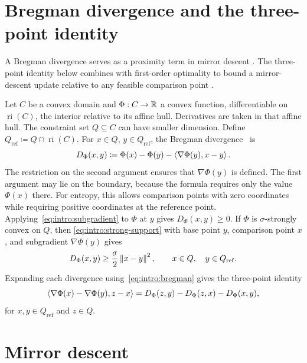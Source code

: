 \section{Bregman divergence and the three-point identity}
\label{sec:intro:bregman}

A Bregman divergence serves as a proximity term in mirror
descent \cite{shalev2007primal,abernethy2009competing,hazan2010extracting}.
The three-point identity below combines with first-order optimality to bound
a mirror-descent update relative to any feasible comparison point
\cite{prox-siam93,SGD-robust,tseng-accelerated,wei2020online}.

Let $C$ be a convex domain and $\Phi:C\to\mathbb{R}$ a convex function,
differentiable on $\operatorname{ri}(C)$, the interior relative
to its affine hull. Derivatives are taken in that affine hull. The
constraint set $Q\subseteq C$ can have smaller dimension. Define
$Q_{\mathrm{ref}}\coloneqq Q\cap \operatorname{ri}(C)$. For $x\in Q$, $y\in Q_{\mathrm{ref}}$, the Bregman
divergence~\cite{bregman1967relaxation} is
\begin{equation}\label{eq:intro:bregman}
 D_\Phi(x,y)\coloneqq\Phi(x)-\Phi(y)-\left\langle \nabla\Phi(y),x-y \right\rangle.
\end{equation}
The restriction on the second argument ensures that $\nabla\Phi(y)$ is
defined. The first argument may lie on the boundary, because the formula
requires only the value $\Phi(x)$ there. For entropy, this allows comparison
points with zero coordinates while requiring positive coordinates at the
reference point.
Applying~\eqref{eq:intro:subgradient} to $\Phi$ at $y$ gives
$D_\Phi(x,y)\ge0$. If $\Phi$ is $\sigma$-strongly convex on $Q$, then
\eqref{eq:intro:strong-support} with base point $y$, comparison point $x$,
and subgradient $\nabla\Phi(y)$ gives
\begin{equation}\label{eq:intro:bregman-curvature}
 D_\Phi(x,y)\ge\frac\sigma2\left\lVert x-y \right\rVert^2,
 \qquad x\in Q,\quad y\in Q_{\mathrm{ref}}.
\end{equation}
Expanding each divergence using~\eqref{eq:intro:bregman} gives the
three-point identity
\begin{equation}\label{eq:intro:three-point}
 \left\langle \nabla\Phi(x)-\nabla\Phi(y),z-x \right\rangle
 =D_\Phi(z,y)-D_\Phi(z,x)-D_\Phi(x,y),
\end{equation}
for $x,y\in Q_{\mathrm{ref}}$ and $z\in Q$.

\section{Mirror descent}
\label{sec:intro:mirror-descent}

